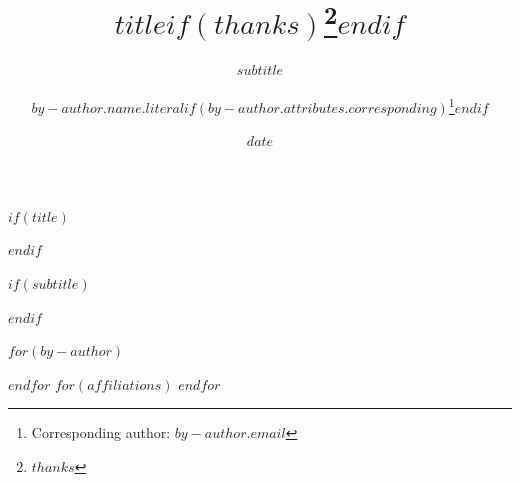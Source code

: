$if(title)$
\title{$title$$if(thanks)$\thanks{$thanks$}$endif$}
$endif$

$if(subtitle)$
\subtitle{$subtitle$}
$endif$

$for(by-author)$
  \author[$for(by-author.affiliations)$$by-author.affiliations.number$$sep$,$endfor$]{$by-author.name.literal$$if(by-author.attributes.corresponding)$\thanks{Corresponding author: $by-author.email$}$endif$}
$endfor$
$for(affiliations)$
$endfor$

\date{$date$}